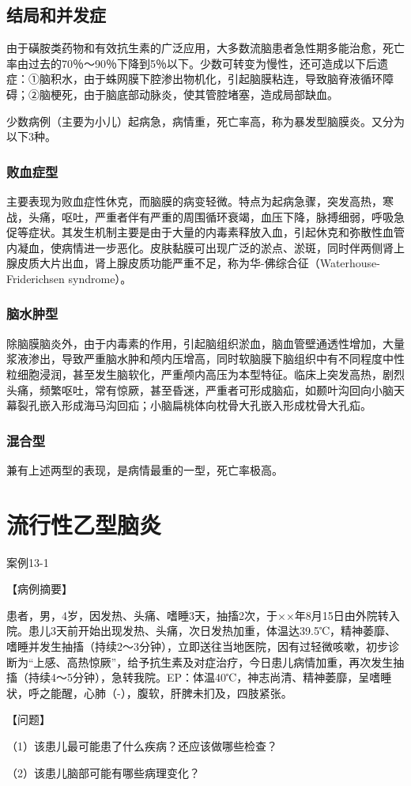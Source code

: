 \subsection{结局和并发症}

由于磺胺类药物和有效抗生素的广泛应用，大多数流脑患者急性期多能治愈，死亡率由过去的70％～90％下降到5％以下。少数可转变为慢性，还可造成以下后遗症：①脑积水，由于蛛网膜下腔渗出物机化，引起脑膜粘连，导致脑脊液循环障碍；②脑梗死，由于脑底部动脉炎，使其管腔堵塞，造成局部缺血。

少数病例（主要为小儿）起病急，病情重，死亡率高，称为暴发型脑膜炎。又分为以下3种。

\subsubsection{败血症型}

主要表现为败血症性休克，而脑膜的病变轻微。特点为起病急骤，突发高热，寒战，头痛，呕吐，严重者伴有严重的周围循环衰竭，血压下降，脉搏细弱，呼吸急促等症状。其发生机制主要是由于大量的内毒素释放入血，引起休克和弥散性血管内凝血，使病情进一步恶化。皮肤黏膜可出现广泛的淤点、淤斑，同时伴两侧肾上腺皮质大片出血，肾上腺皮质功能严重不足，称为华-佛综合征（Waterhouse-Friderichsen
syndrome）。

\subsubsection{脑水肿型}

除脑膜脑炎外，由于内毒素的作用，引起脑组织淤血，脑血管壁通透性增加，大量浆液渗出，导致严重脑水肿和颅内压增高，同时软脑膜下脑组织中有不同程度中性粒细胞浸润，甚至发生脑软化，严重颅内高压为本型特征。临床上突发高热，剧烈头痛，频繁呕吐，常有惊厥，甚至昏迷，严重者可形成脑疝，如颞叶沟回向小脑天幕裂孔嵌入形成海马沟回疝；小脑扁桃体向枕骨大孔嵌入形成枕骨大孔疝。

\subsubsection{混合型}

兼有上述两型的表现，是病情最重的一型，死亡率极高。

\section{流行性乙型脑炎}

\begin{framed}
{案例13-1}

{【病例摘要】}

患者，男，4岁，因发热、头痛、嗜睡3天，抽搐2次，于××年8月15日由外院转入院。患儿3天前开始出现发热、头痛，次日发热加重，体温达39.5℃，精神萎靡、嗜睡并发生抽搐（持续2～3分钟），立即送往当地医院，因有过轻微咳嗽，初步诊断为“上感、高热惊厥”，给予抗生素及对症治疗，今日患儿病情加重，再次发生抽搐（持续4～5分钟），急转我院。EP：体温40℃，神志尚清、精神萎靡，呈嗜睡状，呼之能醒，心肺（-），腹软，肝脾未扪及，四肢紧张。

{【问题】}

（1）该患儿最可能患了什么疾病？还应该做哪些检查？

（2）该患儿脑部可能有哪些病理变化？
\end{framed}


